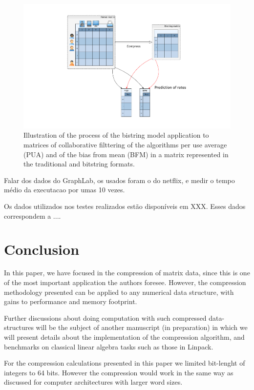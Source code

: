 \documentclass[10pt]{article}
\begin{document}
\begin{figure}[h]
  \centering
  \includegraphics[scale=0.4,trim=5cm 0cm 5cm 0cm,clip]{cf}
  \caption{Illustration of the process of the bistring model application to matrices of collaborative filttering of the 
algorithms per use average (PUA) and of the bias from mean (BFM) in a matrix represented in the traditional and 
bitstring formats.}
  \label{cf}
\end{figure}



Falar dos dados do GraphLab, os usados foram o do netflix, e medir o tempo 
médio da executacao por umas 10 vezes.

Os dados utilizados nos testes realizados estão disponíveis em XXX. Esses dados 
correspondem a ....

\section*{Conclusion}

In this paper, we have focused in the compression of matrix data, since this is
one of the most important application the authors foresee. However, the
compression methodology presented can be applied to any numerical data
structure, with gains to performance and memory footprint\cite{teseCrysttian}. 

Further discussions about doing computation with such compressed data-structures
will be the subject of another manuscript (in preparation) in which we will
present details about the implementation of the compression algorithm, and
benchmarks on classical linear algebra tasks such as those in
Linpack\cite{dongarra1979linpack}.

For the compression calculations presented in this paper we limited bit-lenght of integers to 64 bits. However the 
compression would work in the same way as discussed for computer architectures with larger word sizes. 
\end{document}
